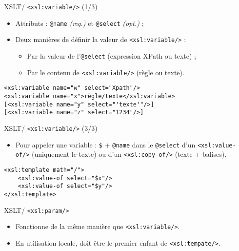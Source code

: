 \documentclass{beamer}
\begin{document}
    \begin{frame}[fragile]{XSLT/ \texttt{<xsl:variable/>} (1/3)}
        \Large
        \begin{itemize}
            \item Attributs : \texttt{@name} \textit{(req.)} et \texttt{@select} \textit{(opt.)} ;
            \bigskip
            \item Deux manières de définir la valeur de \texttt{<xsl:variable/>} :
            \begin{itemize}
            \Large
                \item Par la valeur de l'\texttt{@select} (expression XPath ou texte) ;
                \item Par le contenu de \texttt{<xsl:variable/>} (règle ou texte).
            \end{itemize}
        \end{itemize}
        \normalsize
        \begin{verbatim}
<xsl:variable name="w" select="Xpath"/>
<xsl:variable name="x">règle/texte</xsl:variable>
[<xsl:variable name="y" select="'texte'"/>]
[<xsl:variable name="z" select="1234"/>]
        \end{verbatim}
    \end{frame}

    \begin{frame}[fragile]{XSLT/ \texttt{<xsl:variable/>} (3/3)}
        \Large
        \begin{itemize}
            \item  Pour appeler une variable : \texttt{\$} + \texttt{@name} dans le \texttt{@select} d'un \texttt{<xsl:value-of/>} (uniquement le texte) ou d'un \texttt{<xsl:copy-of/>} (texte + balises).
        \end{itemize}
        \large
        \begin{verbatim}
<xsl:template math="/">
    <xsl:value-of select="$x"/>
    <xsl:value-of select="$y"/>
</xsl:template>
        \end{verbatim}
    \end{frame}

    \begin{frame}{XSLT/ \texttt{<xsl:param/>}}
        \Large
        \begin{itemize}
            \item Fonctionne de la même manière que \texttt{<xsl:variable/>}.
            \item En utilisation locale, doit être le premier enfant de \texttt{<xsl:tempate/>}.
        \end{itemize}
    \end{frame}
\end{document}
